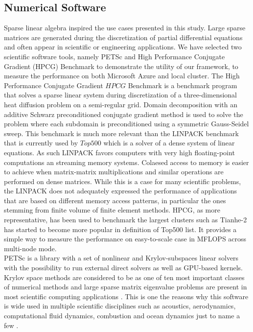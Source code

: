 \documentclass[3p,times]{elsarticle}
\begin{document}
\subsection{Numerical Software}
\label{sec:numerical}

Sparse linear algebra inspired the use cases presented in this study. Large sparse matrices are generated during the discretization of partial differential equations and often appear in scientific or engineering applications. We have selected two scientific software tools, namely PETSc and High Performance Conjugate Gradient (HPCG) Benchmark to demonstrate the utility of our framework, to measure the performance on both Microsoft Azure and local cluster. 
The High Performance Conjugate Gradient \(HPCG\) Benchmark \cite{Heroux2013} is a benchmark program that solves a sparse linear system during discretization of a three-dimensional heat diffusion problem on a semi-regular grid. Domain decomposition with an additive Schwarz preconditioned conjugate gradient method is used to solve the problem where each subdomain is preconditioned using a symmetric Gauss-Seidel sweep. This benchmark is much more relevant than the LINPACK benchmark that is currently used by $Top500$ which is a solver of a dense system of linear equations. As such LINPACK favors computers with very high floating-point computations an streaming memory systems. Colaesed access to memory is easier to achieve when matrix-matrix multiplications and similar operations are performed on dense matrices. While this is a case for many scientific problems, the LINPACK does not adequately expressed the performance of applications that are based on different memory access patterns, in particular the ones stemming from finite volume of finite element methods. HPCG, as more representative, has been used to benchmark the largest clusters such as Tianhe-2 \cite{Xianyi2014} has started to become more popular in definition of Top500 list. It provides a simple way to measure the performance on easy-to-scale case in MFLOPS across multi-node mode. \\
PETSc is a library with a set of nonlinear and Krylov-subspaces linear solvers with the possibility to run external direct solvers as well as GPU-based kernels. Krylov space methods are considered to be as one of ten most important classes of numerical methods and large sparse matrix eigenvalue problems are present in most scientific computing applications \cite{Gutknecht2005}. This is one the reasons why this software is wide used in multiple scientific disciplines such as acoustics, aerodynamics, computational fluid dynamics, combustion and ocean dynamics just to name a few \cite{petsc-efficient}.\\
\end{document}
